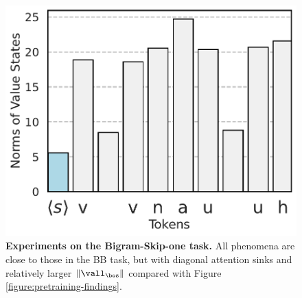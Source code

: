\begin{figure}[t]
\begin{minipage}{0.27\textwidth}
      \vspace{0pt}
      \vspace{-.2em}
      \includegraphics[width=\linewidth]{Figures/BBM_appendix/BS_value.pdf}
  \end{minipage}
  \caption{\small \textbf{Experiments on the Bigram-Skip-one task.} 
  All phenomena are close to those in the BB task, but with diagonal attention sinks and relatively larger $\|\vall_\bos\|$ compared with Figure \ref{figure:pretraining-findings}.}
  \label{appfigure:BS-findings}
  \vspace{-1em}
\end{figure}


